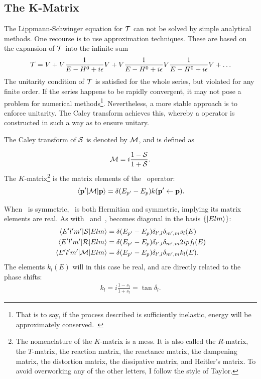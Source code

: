 \subsection{The K-Matrix}

The Lippmann-Schwinger equation for \(\mathcal{T}\) can not be solved by simple
analytical methods. One recourse is to use approximation techniques. These are
based on the expansion of \(\mathcal{T}\) into the 
infinite sum
\begin{equation*}
  \mathcal{T} = V + V \frac{1}{E-H^{0}+i\epsilon}V + V \frac{1}{E-H^{0}+i\epsilon}V \frac{1}{E-H^{0}+i\epsilon} V+\ldots
\end{equation*}
The unitarity condition of \(\mathcal{T}\) is satisfied for the whole series, but
violated for any finite order. If the series happens to be rapidly convergent,
it may not pose a problem for numerical methods\footnote{That is to say, if the
  process described is sufficiently inelastic, energy will be approximately
  conserved.~\cite{Le_Ru_2013}}. Nevertheless, a more stable
approach is to enforce unitarity. The Caley 
transform achieves this, whereby a operator is constructed in such a way as to
ensure unitary.

The Caley transform of \(\mathcal{S}\) is denoted by \(\mathcal{M}\), and is defined
as

\begin{equation*}
  \mathcal{M} = i \frac{1-\mathcal{S}}{1+\mathcal{S}}.
\end{equation*}
The \(K\)-matrix\footnote{The nomenclature of the \(K\)-matrix is a mess. It is
  also called the \(R\)-matrix, the \(T\)-matrix, the reaction matrix, the
  reactance matrix, the dampening matrix, the distortion matrix, the dissipative
  matrix, and Heitler's
  matrix. To avoid overworking any of the other
  letters, I follow the style of Taylor.} is the matrix elements of the\
 operator:
\begin{equation*}
  \mel{\vb{p}^{\prime}}{\mathcal{M}}{\vb{p}} = \delta(E_{p^{\prime}}-E_{p})k(\vb{p}^{\prime}\leftarrow\vb{p}).
\end{equation*}

When\  is symmetric,\  is both Hermitian and
symmetric, implying its matrix elements are real.
As with\  and\ ,  becomes diagonal in the basis
\(\left\{ \ket{Elm} \right\}\):
\begin{align*}
  \mel{E^{\prime}l^{\prime}m^{\prime}}{\mathcal{S}}{Elm} &= \delta(E_{p^{\prime}}-E_{p})\delta_{l^{\prime},l}\delta_{m^{\prime},m}s_{l}(E)\\
  \mel{E^{\prime}l^{\prime}m^{\prime}}{\mathcal{R}}{Elm} &= \delta(E_{p^{\prime}}-E_{p})\delta_{l^{\prime},l}\delta_{m^{\prime},m}2ipf_{l}(E)\\
  \mel{E^{\prime}l^{\prime}m^{\prime}}{\mathcal{M}}{Elm} &= \delta(E_{p^{\prime}}-E_{p})\delta_{l^{\prime},l}\delta_{m^{\prime},m}k_{l}(E).\\
\end{align*}
The elements \(k_{l}(E)\) will in this case be real, and are directly related to
the phase shifts:
\begin{align*}
  k_{l} = i \frac{1-s_{l}}{1+s_{l}} = \tan\delta_{l}.
\end{align*}

